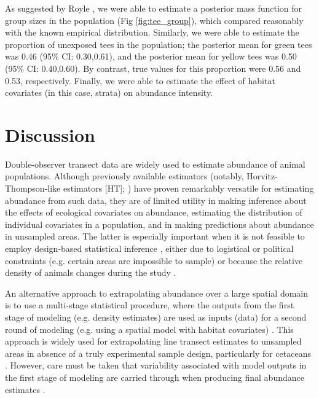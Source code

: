 \documentclass[10pt]{article}
\begin{document}
As suggested by Royle  \cite{Royle2008}, we were able to
estimate a posterior mass function for group sizes in the population (Fig \ref{fig:tee_group}), which compared reasonably with the known empirical distribution.  Similarly, we were able to estimate the proportion of unexposed tees in the population; the posterior mean for green tees was 0.46 (95\% CI: 0.30,0.61), and the posterior mean for yellow tees was 0.50 (95\% CI: 0.40,0.60).  By contrast, true values for this proportion were 0.56 and 0.53, respectively.  Finally, we were able to estimate the effect of habitat covariates (in this case, strata) on abundance intensity.


\section*{Discussion}

Double-observer transect data are widely used to estimate abundance of animal populations. Although previously available estimators (notably, Horvitz-Thompson-like estimators [HT]; \cite{BorchersEtAl2002}) have proven remarkably versatile for estimating abundance from such data, they are of limited utility in making inference about the effects of ecological covariates on abundance, estimating the distribution of individual covariates in a population, and in making predictions about abundance in unsampled areas.
The latter is especially important when it is not feasible to employ design-based statistical inference \cite{Cochran1977}, either due to logistical or political constraints (e.g. certain areas are impossible to sample) or because the relative density of animals changes during the study \cite{VerHoefEtAl2011}.

An alternative approach to extrapolating abundance over a large spatial domain is to use a multi-stage statistical procedure, where the outputs from the first stage of modeling (e.g. density estimates) are used as inputs (data) for a second round of modeling (e.g. using a spatial model with habitat covariates) \cite{Forney2000,HedleyBuckland2004}.  This approach is widely used for extrapolating line transect estimates to unsampled areas in absence of a truly experimental sample design, particularly for cetaceans \cite{RedfernEtAl2006,BeckerEtAl2010}.  However, care must be taken that variability associated with model outputs in the first stage of modeling are carried through when producing final abundance estimates \cite{VerHoefEtAl2011}.
\end{document}
